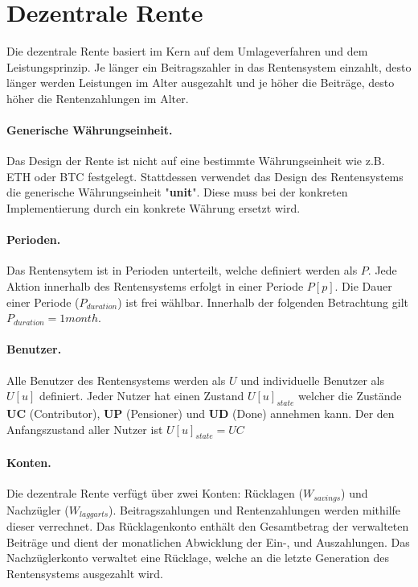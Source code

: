 \section{Dezentrale Rente}
Die dezentrale Rente basiert im Kern auf dem Umlageverfahren und dem
Leistungsprinzip. Je länger ein Beitragszahler in das Rentensystem einzahlt, 
desto länger werden Leistungen im Alter ausgezahlt und je höher die Beiträge,
desto höher die Rentenzahlungen im Alter.

\paragraph{Generische Währungseinheit.} Das Design der Rente ist nicht auf eine bestimmte 
Währungseinheit wie z.B. ETH oder BTC festgelegt. Stattdessen verwendet das Design des
Rentensystems die generische Währungseinheit "\textbf{unit}". Diese muss bei der konkreten
Implementierung durch ein konkrete Währung ersetzt wird.

\paragraph{Perioden.} Das Rentensytem ist in Perioden unterteilt, welche definiert werden als $P$. Jede Aktion innerhalb des Rentensystems erfolgt
in einer Periode $P[p]$. Die Dauer einer Periode ($P_{duration}$) ist frei wählbar. Innerhalb der folgenden Betrachtung gilt $P_{duration} = 1 month$.

\paragraph{Benutzer.} Alle Benutzer des Rentensystems werden als $U$ und individuelle Benutzer als $U[u]$ definiert. Jeder Nutzer hat einen Zustand $U[u]_{state}$ welcher die Zustände \textbf{UC} (Contributor),
\textbf{UP} (Pensioner) und \textbf{UD} (Done) annehmen kann.
Der den Anfangszustand aller Nutzer ist $U[u]_{state} = UC$ 

\paragraph{Konten.} Die dezentrale Rente verfügt über zwei Konten: Rücklagen ($W_{savings}$) und Nachzügler ($W_{laggarts}$). Beitragszahlungen und Rentenzahlungen werden mithilfe dieser verrechnet. Das Rücklagenkonto enthält den Gesamtbetrag der verwalteten Beiträge und dient der monatlichen Abwicklung der Ein-, und Auszahlungen. Das Nachzüglerkonto  
verwaltet eine Rücklage, welche an die letzte Generation des Rentensystems ausgezahlt wird.

